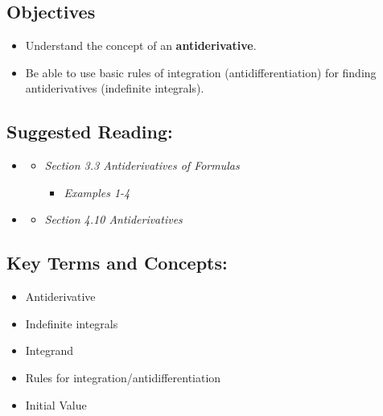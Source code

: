 
\vspace{-0.25 in}
\begin{framed}
\subsection*{Objectives}
\begin{itemize}
    \item Understand the concept of an \textbf{antiderivative}.
    \item Be able to use basic rules of integration (antidifferentiation) for finding antiderivatives (indefinite integrals).
\end{itemize}

\subsection*{Suggested Reading:}
\begin{itemize}
\item \cite{Calaway}\footnotemark[1]
   \begin{itemize}
        \item \emph{Section 3.3 Antiderivatives of Formulas}
        \begin{itemize}
            \item \emph{Examples 1-4}
        \end{itemize}
    \end{itemize}

\item \cite{openstax}\footnotemark[2]
    \begin{itemize}
        \item \emph{Section 4.10 Antiderivatives}\footnotemark[3]
        
    \end{itemize}
\end{itemize}
\subsection*{Key Terms and Concepts:} 

\begin{itemize}
    \item Antiderivative
    \item Indefinite integrals
    \item Integrand
    \item Rules for integration/antidifferentiation
    \item Initial Value
\end{itemize}
\end{framed}

